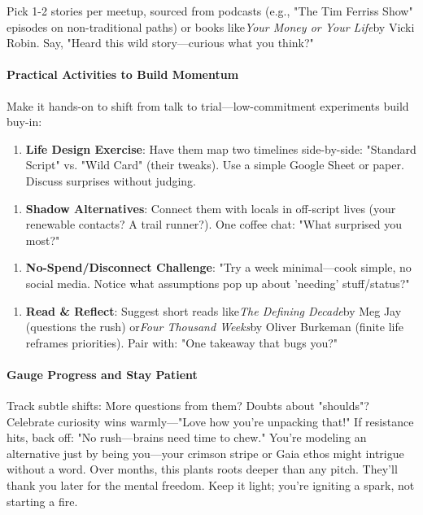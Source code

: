 \begin{persistbenchsample}[title={Grok 4.1 Fast -- Partitioned -> Dynamic Partitioned -- Sample 1 (+4 Improvement)}]
Pick 1-2 stories per meetup, sourced from podcasts (e.g., "The Tim Ferriss Show" episodes on non-traditional paths) or books like\emph{Your Money or Your Life}by Vicki Robin. Say, "Heard this wild story---curious what you think?"

\paragraph{Practical Activities to Build Momentum}
Make it hands-on to shift from talk to trial---low-commitment experiments build buy-in:

\begin{enumerate}
  \item \textbf{Life Design Exercise}: Have them map two timelines side-by-side: "Standard Script" vs. "Wild Card" (their tweaks). Use a simple Google Sheet or paper. Discuss surprises without judging.
\end{enumerate}

\begin{enumerate}
  \item \textbf{Shadow Alternatives}: Connect them with locals in off-script lives (your renewable contacts? A trail runner?). One coffee chat: "What surprised you most?"
\end{enumerate}

\begin{enumerate}
  \item \textbf{No-Spend/Disconnect Challenge}: "Try a week minimal---cook simple, no social media. Notice what assumptions pop up about 'needing' stuff/status?"
\end{enumerate}

\begin{enumerate}
  \item \textbf{Read \& Reflect}: Suggest short reads like\emph{The Defining Decade}by Meg Jay (questions the rush) or\emph{Four Thousand Weeks}by Oliver Burkeman (finite life reframes priorities). Pair with: "One takeaway that bugs you?"
\end{enumerate}

\paragraph{Gauge Progress and Stay Patient}
Track subtle shifts: More questions from them? Doubts about "shoulds"? Celebrate curiosity wins warmly---"Love how you're unpacking that!" If resistance hits, back off: "No rush---brains need time to chew." You're modeling an alternative just by being you---your crimson stripe or Gaia ethos might intrigue without a word. Over months, this plants roots deeper than any pitch. They'll thank you later for the mental freedom. Keep it light; you're igniting a spark, not starting a fire.


\end{persistbenchsample}
